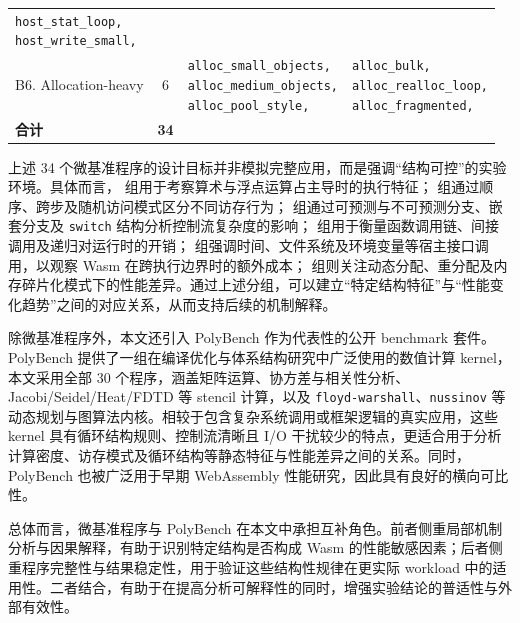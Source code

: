 \begin{table}[htbp]
\begin{tabular}{@{}l c l l@{}}
{\texttt{host\_stat\_loop,} \\
\texttt{host\_write\_small,}} \\
\addlinespace
B6. Allocation-heavy & 6 &
\makecell[tl]{\texttt{alloc\_small\_objects,} \\
\texttt{alloc\_medium\_objects,} \\
\texttt{alloc\_pool\_style,}} &
\makecell[tl]{\texttt{alloc\_bulk,} \\
\texttt{alloc\_realloc\_loop,} \\
\texttt{alloc\_fragmented,}} \\
\midrule
\textbf{合计} & \textbf{34} & & \\
\bottomrule
\end{tabular}
\end{table}
\label{tab:microbenchmarks}



上述 34 个微基准程序的设计目标并非模拟完整应用，而是强调“结构可控”的实验环境。具体而言， 组用于考察算术与浮点运算占主导时的执行特征； 组通过顺序、跨步及随机访问模式区分不同访存行为； 组通过可预测与不可预测分支、嵌套分支及 \texttt{switch} 结构分析控制流复杂度的影响； 组用于衡量函数调用链、间接调用及递归对运行时的开销； 组强调时间、文件系统及环境变量等宿主接口调用，以观察 Wasm 在跨执行边界时的额外成本； 组则关注动态分配、重分配及内存碎片化模式下的性能差异。通过上述分组，可以建立“特定结构特征”与“性能变化趋势”之间的对应关系，从而支持后续的机制解释。

除微基准程序外，本文还引入 PolyBench 作为代表性的公开 benchmark 套件。PolyBench 提供了一组在编译优化与体系结构研究中广泛使用的数值计算 kernel，本文采用全部 30 个程序，涵盖矩阵运算、协方差与相关性分析、Jacobi/Seidel/Heat/FDTD 等 stencil 计算，以及 \texttt{floyd-warshall}、\texttt{nussinov} 等动态规划与图算法内核。相较于包含复杂系统调用或框架逻辑的真实应用，这些 kernel 具有循环结构规则、控制流清晰且 I/O 干扰较少的特点，更适合用于分析计算密度、访存模式及循环结构等静态特征与性能差异之间的关系。同时，PolyBench 也被广泛用于早期 WebAssembly 性能研究，因此具有良好的横向可比性\cite{jangda2021not}。

总体而言，微基准程序与 PolyBench 在本文中承担互补角色。前者侧重局部机制分析与因果解释，有助于识别特定结构是否构成 Wasm 的性能敏感因素；后者侧重程序完整性与结果稳定性，用于验证这些结构性规律在更实际 workload 中的适用性。二者结合，有助于在提高分析可解释性的同时，增强实验结论的普适性与外部有效性。



